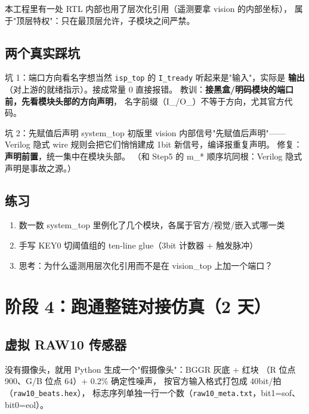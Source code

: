 \documentclass[11pt]{ctexart}
\newcommand{\code}[1]{\texttt{#1}}
\begin{document}
本工程里有一处 RTL 内部也用了层次化引用（遥测要拿 vision 的内部坐标），
属于"顶层特权"：只在最顶层允许，子模块之间严禁。

\subsection{两个真实踩坑}

\begin{warnbox}{坑 1：端口方向看名字想当然}
\code{isp\_top} 的 \code{I\_tready} 听起来是"输入"，实际是
\textbf{输出}（对上游的就绪指示）。接成常量 0 直接报错。
教训：\textbf{接黑盒/明码模块的端口前，先看模块头部的方向声明}，
名字前缀（I\_/O\_）不等于方向，尤其官方代码。
\end{warnbox}

\begin{warnbox}{坑 2：先赋值后声明}
system\_top 初版里 vision 内部信号"先赋值后声明"——Verilog 隐式
wire 规则会把它们悄悄建成 1bit 新信号，编译报重复声明。
修复：\textbf{声明前置}，统一集中在模块头部。
（和 Step5 的 m\_* 顺序坑同根：Verilog 隐式声明是事故之源。）
\end{warnbox}

\subsection{练习}

\begin{enumerate}
  \item 数一数 system\_top 里例化了几个模块，各属于官方/视觉/嵌入式哪一类
  \item 手写 KEY0 切阈值组的 ten-line glue（3bit 计数器 + 触发脉冲）
  \item 思考：为什么遥测用层次化引用而不是在 vision\_top 上加一个端口？
\end{enumerate}

\section{阶段 4：跑通整链对接仿真（2 天）}

\subsection{虚拟 RAW10 传感器}

没有摄像头，就用 Python 生成一个"假摄像头"：BGGR 灰底 + 红块
（R 位点 900、G/B 位点 64）+ 0.2\% 确定性噪声，
按官方输入格式打包成 40bit/拍（\code{raw10\_beats.hex}），
标志序列单独一行一个数（\code{raw10\_meta.txt}，bit1=sof、bit0=eol）。
\end{document}
